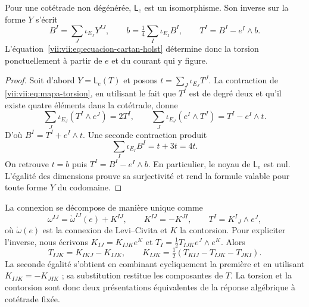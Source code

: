 \begin{theorem}
\label{vii:vii:thm:inversion-torsion}
Pour une cotétrade non dégénérée, \(\mathsf L_e\) est un isomorphisme.
Son inverse sur la forme \(Y\) s'écrit
\begin{equation}
 B^I=\sum_J\iota_{E_J}Y^{IJ},\qquad
 b=\tfrac14\sum_I\iota_{E_I}B^I,\qquad
 T^I=B^I-e^I\wedge b.
 \label{vii:vii:eq:torsion-explicita}
\end{equation}
L'équation~\eqref{vii:vii:eq:ecuacion-cartan-holst} détermine donc
la torsion ponctuellement à partir de \(e\) et du courant qui y
figure.
\end{theorem}
\begin{proof}
Soit d'abord \(Y=\mathsf L_e(T)\) et posons
\(t=\sum_J\iota_{E_J}T^J\). La contraction de
\eqref{vii:vii:eq:mapa-torsion}, en utilisant le fait que \(T^I\) est de degré deux
et qu'il existe quatre éléments dans la cotétrade, donne
\[
 \sum_J\iota_{E_J}(T^I\wedge e^J)=2T^I,
 \qquad
 \sum_J\iota_{E_J}(e^I\wedge T^J)=T^I-e^I\wedge t.
\]
D'où \(B^I=T^I+e^I\wedge t\). Une seconde contraction produit
\[
 \sum_I\iota_{E_I}B^I=t+3t=4t.
\]
On retrouve \(t=b\) puis \(T^I=B^I-e^I\wedge b\).
En particulier, le noyau de \(\mathsf L_e\) est nul. L'égalité
des dimensions prouve sa surjectivité et rend la formule valable
pour toute forme \(Y\) du codomaine.
\end{proof}

La connexion se décompose de manière unique comme
\begin{equation}
 \omega^{IJ}=\mathring\omega^{IJ}(e)+K^{IJ},\qquad
 K^{IJ}=-K^{JI},\qquad T^I=K^I{}_{J}\wedge e^J,
 \label{vii:vii:eq:contorsion}
\end{equation}
où \(\mathring\omega(e)\) est la connexion de Levi--Civita et \(K\) la contorsion. Pour expliciter l'inverse, nous écrivons \(K_{IJ}=K_{IJK}e^K\) et \(T_I=\tfrac12T_{IJK}e^J\wedge e^K\). Alors
\begin{equation}
 T_{IJK}=K_{IKJ}-K_{IJK},\qquad
 K_{IJK}=\tfrac12(T_{KIJ}-T_{IJK}-T_{JKI}).
 \label{vii:vii:eq:contorsion-componentes}
\end{equation}
La seconde égalité s'obtient en combinant cycliquement la première et
en utilisant \(K_{IJK}=-K_{JIK}\) ; sa substitution restitue les composantes
de \(T\). La torsion et la contorsion sont donc deux
présentations équivalentes de la réponse algébrique à cotétrade fixée.

